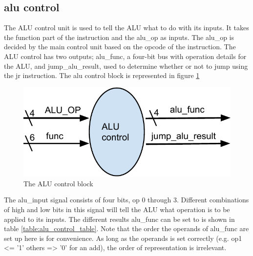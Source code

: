 \subsection*{alu control}

The ALU control unit is used to tell the ALU what to do with its inputs. It takes the function part of the instruction and the alu\_op as inputs. The alu\_op is decided by the main control unit based on the opcode of the instruction. The ALU control has two outputs; alu\_func, a four-bit bus with operation details for the ALU, and jump\_alu\_result, used to determine whether or not to jump using the jr instruction. The alu control block is represented in figure \ref {fig:alu_control}
\begin{figure}
	\label{fig:alu_control}
	\includegraphics{figures/alu_control}
	\caption{The ALU control block}
\end{figure}

The alu\_input signal consists of four bits, op 0 through 3. Different combinations of high and low bits in this signal will tell the ALU what operation is to be applied to its inputs.  The different results alu\_func can be set to is shown in table \ref{table:alu_control_table}. Note that the order the operands of alu\_func are set up here is for convenience. As long as the operands is set correctly (e.g. op1 <= '1' others => '0' for an add), the order of representation is irrelevant. 

